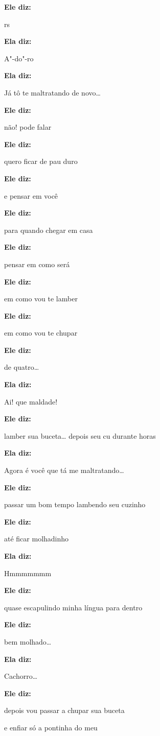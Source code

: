 \textbf{Ele diz:}

rs

\textbf{Ela diz:}

A"-do"-ro

\textbf{Ela diz:}

Já tô te maltratando de novo…

\textbf{Ele diz:}

não! pode falar

\textbf{Ele diz:}

quero ficar de pau duro

\textbf{Ele diz:}

e pensar em você

\textbf{Ele diz:}

para quando chegar em casa

\textbf{Ele diz:}

pensar em como será

\textbf{Ele diz:}

em como vou te lamber

\textbf{Ele diz:}

em como vou te chupar

\textbf{Ele diz:}

de quatro…

\textbf{Ela diz:}

Ai! que maldade!

\textbf{Ele diz:}

lamber sua buceta… depois seu cu durante horas

\textbf{Ela diz:}

Agora é você que tá me maltratando…

\textbf{Ele diz:}

passar um bom tempo lambendo seu cuzinho

\textbf{Ele diz:}

até ficar molhadinho

\textbf{Ela diz:}

Hmmmmmmm

\textbf{Ele diz:}

quase escapulindo minha língua para dentro

\textbf{Ele diz:}

bem molhado…

\textbf{Ela diz:}

Cachorro…

\textbf{Ele diz:}

depois vou passar a chupar sua buceta

e enfiar só a pontinha do meu

